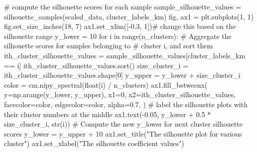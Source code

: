 \documentclass[
  11pt,
  letterpaper,
  DIV=11,
  numbers=noendperiod]{scrartcl}
\newenvironment{Shaded}{\begin{snugshade}}{\end{snugshade}}
\newcommand{\BuiltInTok}[1]{\textcolor[rgb]{0.00,0.23,0.31}{#1}}
\newcommand{\CommentTok}[1]{\textcolor[rgb]{0.37,0.37,0.37}{#1}}
\newcommand{\ControlFlowTok}[1]{\textcolor[rgb]{0.00,0.23,0.31}{#1}}
\newcommand{\DecValTok}[1]{\textcolor[rgb]{0.68,0.00,0.00}{#1}}
\newcommand{\FloatTok}[1]{\textcolor[rgb]{0.68,0.00,0.00}{#1}}
\newcommand{\KeywordTok}[1]{\textcolor[rgb]{0.00,0.23,0.31}{#1}}
\newcommand{\NormalTok}[1]{\textcolor[rgb]{0.00,0.23,0.31}{#1}}
\newcommand{\OperatorTok}[1]{\textcolor[rgb]{0.37,0.37,0.37}{#1}}
\newcommand{\StringTok}[1]{\textcolor[rgb]{0.13,0.47,0.30}{#1}}
\begin{document}
\begin{Shaded}
\begin{Highlighting}[]
    \CommentTok{\# compute the silhouette scores for each sample}
\NormalTok{    sample\_silhouette\_values }\OperatorTok{=}\NormalTok{ silhouette\_samples(scaled\_data, cluster\_labels\_km)}
\NormalTok{    fig, ax1 }\OperatorTok{=}\NormalTok{ plt.subplots(}\DecValTok{1}\NormalTok{, }\DecValTok{1}\NormalTok{)}
\NormalTok{    fig.set\_size\_inches(}\DecValTok{18}\NormalTok{, }\DecValTok{7}\NormalTok{)}
\NormalTok{    ax1.set\_xlim([}\OperatorTok{{-}}\FloatTok{0.3}\NormalTok{, }\DecValTok{1}\NormalTok{])}\CommentTok{\# change this based on the silhouette range}
\NormalTok{    y\_lower }\OperatorTok{=} \DecValTok{10}
    \ControlFlowTok{for}\NormalTok{ i }\KeywordTok{in} \BuiltInTok{range}\NormalTok{(n\_clusters):}
        \CommentTok{\# Aggregate the silhouette scores for samples belonging to}
        \CommentTok{\# cluster i, and sort them}
\NormalTok{        ith\_cluster\_silhouette\_values }\OperatorTok{=}\NormalTok{ sample\_silhouette\_values[cluster\_labels\_km }\OperatorTok{==}\NormalTok{ i]}
\NormalTok{        ith\_cluster\_silhouette\_values.sort()}
\NormalTok{        size\_cluster\_i }\OperatorTok{=}\NormalTok{ ith\_cluster\_silhouette\_values.shape[}\DecValTok{0}\NormalTok{]}
\NormalTok{        y\_upper }\OperatorTok{=}\NormalTok{ y\_lower }\OperatorTok{+}\NormalTok{ size\_cluster\_i}
\NormalTok{        color }\OperatorTok{=}\NormalTok{ cm.nipy\_spectral(}\BuiltInTok{float}\NormalTok{(i) }\OperatorTok{/}\NormalTok{ n\_clusters)}
\NormalTok{        ax1.fill\_betweenx(}
\NormalTok{            y}\OperatorTok{=}\NormalTok{np.arange(y\_lower, y\_upper),}
\NormalTok{            x1}\OperatorTok{=}\DecValTok{0}\NormalTok{,}
\NormalTok{            x2}\OperatorTok{=}\NormalTok{ith\_cluster\_silhouette\_values,}
\NormalTok{            facecolor}\OperatorTok{=}\NormalTok{color,}
\NormalTok{            edgecolor}\OperatorTok{=}\NormalTok{color,}
\NormalTok{            alpha}\OperatorTok{=}\FloatTok{0.7}\NormalTok{,}
\NormalTok{        )}
        \CommentTok{\# label the silhouette plots with their cluster numbers at the middle}
\NormalTok{        ax1.text(}\OperatorTok{{-}}\FloatTok{0.05}\NormalTok{, y\_lower }\OperatorTok{+} \FloatTok{0.5} \OperatorTok{*}\NormalTok{ size\_cluster\_i, }\BuiltInTok{str}\NormalTok{(i))}
        \CommentTok{\# Compute the new y\_lower for next cluster silhouette scores}
\NormalTok{        y\_lower }\OperatorTok{=}\NormalTok{ y\_upper }\OperatorTok{+} \DecValTok{10}  
\NormalTok{    ax1.set\_title(}\StringTok{"The silhouette plot for various cluster"}\NormalTok{)}
\NormalTok{    ax1.set\_xlabel(}\StringTok{"The silhouette coefficient values"}\NormalTok{)}

\end{Highlighting}
\end{Shaded}
\end{document}
